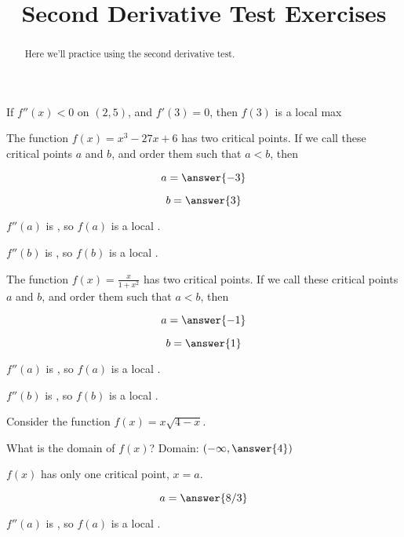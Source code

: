 \documentclass[handout]{ximera}
\title{Second Derivative Test Exercises}
\begin{document}
\begin{abstract}
  Here we'll practice using the second derivative test.
\end{abstract}
\maketitle


\begin{exercise}

If $f''(x)<0$ on $(2,5)$, and $f'(3)=0$, then $f(3)$ is a local max
	\begin{multipleChoice}	
	\end{multipleChoice}
\end{exercise}

\begin{exercise}
The function $f(x) = x^3-27x+6$ has two critical points.  If we call
these critical points $a$ and $b$, and order them such that $a < b$,
then

$$
a = \answer{-3}
$$

$$
b=\answer{3}
$$

$f''(a)$ is , so $f(a)$ is a local .

$f''(b)$ is , so $f(b)$ is a local .
\end{exercise}

\begin{exercise}
The function $f(x) = \displaystyle\frac{x}{1+x^2}$ has two critical points.  If we call
these critical points $a$ and $b$, and order them such that $a < b$,
then

$$
a = \answer{-1}
$$

$$
b=\answer{1}
$$

$f''(a)$ is , so $f(a)$ is a local .

$f''(b)$ is , so $f(b)$ is a local .
\end{exercise}

\begin{exercise}
Consider the function $f(x) = x\sqrt{4-x}$.

What is the domain of $f(x)$?  Domain: $(-\infty,  \answer{4})$

$f(x)$ has only one critical point, $x=a$.

$$
a = \answer{8/3}
$$


$f''(a)$ is , so $f(a)$ is a local .
\end{exercise}
\end{document}
